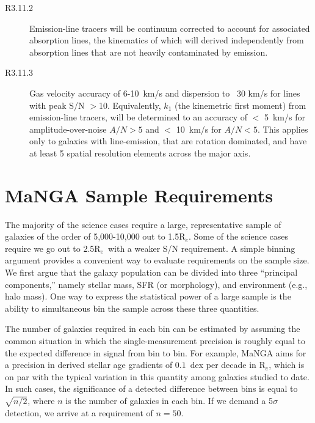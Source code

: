 \documentclass[preprint,11pt]{aastex}
\newcommand{\Reff}{{R$_{e}$}}
\begin{document}
\begin{description}
\begin{description}
\item[R3.11.2]  Emission-line tracers will be continuum corrected to account for
  associated absorption lines, the kinematics of which will derived
  independently from absorption lines that are not heavily contaminated
  by emission.

\item[R3.11.3] Gas velocity accuracy of 6-10~km/s and dispersion to
  ~30 km/s for lines with peak S/N $>$10.  Equivalently, $k_1$ (the
  kinemetric first moment) from emission-line tracers, will be
  determined to an accuracy of $<$ 5~km/s for amplitude-over-noise
  $A/N>5$ and $<$ 10~km/s for $A/N<5$. This applies only to galaxies
  with line-emission, that are rotation dominated, and have at least 5
  spatial resolution elements across the major axis.

\end{description}
\end{description}



\section{MaNGA Sample Requirements} \label{sec:sample_selection}

The majority of the science cases require a large, representative sample of galaxies of the order of 5,000-10,000 out to 1.5\Reff.
Some of the science cases require we go out to 2.5\Reff\ with a weaker S/N requirement. A simple binning argument provides a
convenient way to evaluate requirements on the sample size.  We first argue that the galaxy population can be divided into three
``principal components,'' namely stellar mass, SFR (or morphology), and environment (e.g., halo mass).  One way to express the statistical power of a large
sample is the ability to simultaneous bin the sample across these three quantities.

The number of galaxies required in each bin can be estimated by assuming the common situation in which the
single-measurement precision is roughly equal to the expected difference in signal from bin to bin. For example, MaNGA aims for a
precision in derived stellar age gradients of $0.1$~dex per decade in \Reff, which is on par with the typical variation in this
quantity among galaxies studied to date. In such cases, the significance of a detected
difference between bins is equal to $\sqrt{n/2}$, where $n$ is the number of galaxies in each bin. If we demand a 5$\sigma$
detection, we arrive at a requirement of $n=50$. 
\end{document}
